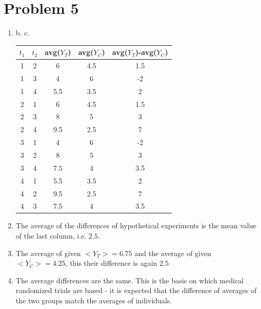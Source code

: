 \documentclass{article}
\newcommand{\1}{\mathbf{1}}
\begin{document}
\section*{Problem 5}
\begin{enumerate}
	\item \addtocounter{enumi}{3} b. c. \begin{table}[h]
            \begin{tabular}{cc|c|c|c}
            $t_1$ & $t_2$  & avg($Y_T$) & avg($Y_C$) & avg($Y_T$)-avg($Y_C$)\\ \hline
            1 & 2 & 6   & 4.5 & 1.5 \\
            1 & 3 & 4   & 6   & -2 \\
            1 & 4 & 5.5 & 3.5 & 2 \\ 
            2 & 1 & 6   & 4.5 & 1.5 \\
            2 & 3 & 8   & 5   & 3 \\
            2 & 4 & 9.5 & 2.5 & 7 \\
            3 & 1 & 4   & 6   & -2 \\
            3 & 2 & 8   & 5   & 3 \\
            3 & 4 & 7.5 & 4   & 3.5 \\
            4 & 1 & 5.5 & 3.5 & 2 \\
            4 & 2 & 9.5 & 2.5 & 7 \\
            4 & 3 & 7.5 & 4 & 3.5
            \end{tabular}
        \end{table}
    \item The average of the differences of hypothetical experiments is the mean value of the last column, i.e. $2.5$.
    \item The average of given $<Y_T>=6.75$ and the average of given $<Y_C>=4.25$, this their difference is again $2.5$
    \item The average differences are the same. This is the basis on which medical randomized trials are based - it is expected that the difference of averages of the two groups match the averages of individuals.
\end{enumerate}



\newpage
\end{document}
